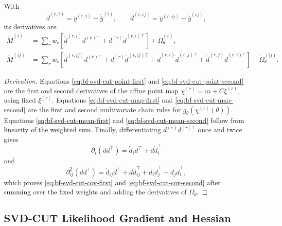 With
\[
  \dot d^{(r,i)}=\dot y^{(r,i)}-\dot{\bar y}^{(i)},\qquad
  \ddot d^{(r,ij)}=\ddot y^{(r,ij)}-\ddot{\bar y}^{(ij)},
\]
its derivatives are
\begin{align}
\label{eq:bf-svd-cut-cov-first}
  \dot M^{(i)}
  &=
  \sum_r w_r
  \left[
    \dot d^{(r,i)}d^{(r)\top}
    +d^{(r)}\dot d^{(r,i)\top}
  \right]
  +\dot\Omega_\theta^{(i)},\\
\label{eq:bf-svd-cut-cov-second}
  \ddot M^{(ij)}
  &=
  \sum_r w_r
  \left[
    \ddot d^{(r,ij)}d^{(r)\top}
    +d^{(r)}\ddot d^{(r,ij)\top}
    +\dot d^{(r,i)}\dot d^{(r,j)\top}
    +\dot d^{(r,j)}\dot d^{(r,i)\top}
  \right]
  +\ddot\Omega_\theta^{(ij)}.
\end{align}

\begin{proof}[Derivation]
Equations \eqref{eq:bf-svd-cut-point-first} and
\eqref{eq:bf-svd-cut-point-second} are the first and second derivatives of the
affine point map $\chi^{(r)}=m+C\xi^{(r)}$, using fixed $\xi^{(r)}$.  Equations
\eqref{eq:bf-svd-cut-map-first} and \eqref{eq:bf-svd-cut-map-second} are the
first and second multivariate chain rules for
$g_\theta(\chi^{(r)}(\theta))$.  Equations
\eqref{eq:bf-svd-cut-mean-first} and \eqref{eq:bf-svd-cut-mean-second} follow
from linearity of the weighted sum.  Finally, differentiating
$d^{(r)}d^{(r)\top}$ once and twice gives
\[
  \partial_i(dd^\top)=\dot d_i d^\top+d\dot d_i^\top
\]
and
\[
  \partial_{ij}^2(dd^\top)
  =
  \ddot d_{ij}d^\top+d\ddot d_{ij}^\top
  +\dot d_i\dot d_j^\top+\dot d_j\dot d_i^\top ,
\]
which proves \eqref{eq:bf-svd-cut-cov-first} and
\eqref{eq:bf-svd-cut-cov-second} after summing over the fixed weights and
adding the derivatives of $\Omega_\theta$.
\end{proof}

\subsection{SVD-CUT Likelihood Gradient and Hessian}
\label{sec:bf-svd-cut-likelihood-derivatives}

